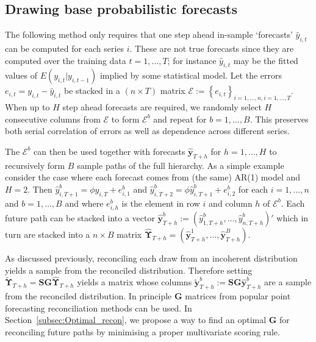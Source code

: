 \documentclass[12pt]{article}
\theoremstyle{definition}
\begin{document}
\subsection{Drawing base probabilistic forecasts} \label{Subsec:Incoherent_samplePaths}
The following method only requires that one step ahead in-sample `forecasts' $\hat{y}_{i,t}$ can be computed for each series $i$.  These are not true forecasts since they are computed over the training data $t=1,\ldots,T$; for instance  $\hat{y}_{i,t}$ may be the fitted values of $E(y_{i,t}|y_{i,t-1})$ implied by some statistical model. Let the errors $e_{i,t} = y_{i,t} - \hat{y}_{i,t}$ be stacked in a $(n \times T)$ matrix $\bm{\mathcal{E}}:=\left\{e_{i,t}\right\}_{i=1,\dots,n,i=1,\dots,T}$.  When up to $H$ step ahead forecasts are required, we randomly select $H$ consecutive columns from $\bm{\mathcal{E}}$ to form $\bm{\mathcal{E}}^b$ and repeat for $b = 1,\dots,B$.  This preserves both serial correlation of errors as well as dependence across different series.

The $\bm{\mathcal{E}}^b$ can then be used together with forecasts $\hat{\bm{y}}_{T+h}$ for $h=1,\ldots,H$ to recursively form $B$ sample paths of the full hierarchy.  As a simple example consider the case where each forecast comes from (the same) AR(1) model and $H=2$.  Then $\hat{{y}}^b_{i,T+1}=\phi{{y}}_{i,T}+e^b_{i,1}$ and $\hat{{y}}^b_{i,T+2}=\phi\hat{{y}}^b_{i,T+1}+e^b_{i,2}$ for each $i=1,\ldots,n$ and $b=1,\ldots,B$ and where $e^b_{i,h}$ is the element in row $i$ and column $h$ of $\bm{\mathcal{E}}^b$.  Each future path can be stacked into a vector $\hat{\bm{y}}^b_{T+h}:=(\hat{{y}}^b_{1,T+h},\ldots,\hat{{y}}^b_{n,T+h})'$ which in turn are stacked into a $n\times B$ matrix $\hat{\bm{\Upsilon}}_{T+h} = (\hat{\bm{y}}^1_{T+h},\dots,\hat{\bm{y}}^B_{T+h})$.

As discussed previously, reconciling each draw from an incoherent distribution yields a sample from the reconciled distribution.  Therefore setting $\tilde{\bm{\Upsilon}}_{T+h} = \bm{SG}\hat{\bm{\Upsilon}}_{T+h}$ yields a matrix whose columns $\tilde{\bm{y}}^b_{T+h} := \bm{SG}\hat{\bm{y}}^b_{T+h}$ are a sample from the reconciled distribution.  In principle $\bm{G}$ matrices from popular point forecasting reconciliation methods can be used. In Section~\ref{subsec:Optimal_recon}, we propose a way to find an optimal $\bm{G}$ for reconciling future paths by minimising a proper multivariate scoring rule. 


\end{document}
